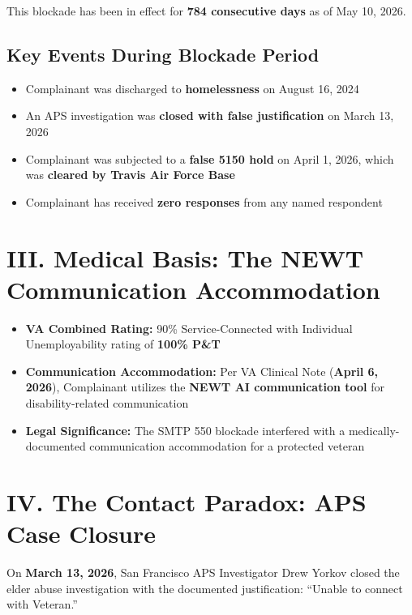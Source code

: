 \documentclass[11pt, a4paper]{article}
\begin{document}
This blockade has been in effect for \textbf{784 consecutive days} as of May 10, 2026.

\subsection{Key Events During Blockade Period}
\begin{itemize}
    \item Complainant was discharged to \textbf{homelessness} on August 16, 2024
    \item An APS investigation was \textbf{closed with false justification} on March 13, 2026
    \item Complainant was subjected to a \textbf{false 5150 hold} on April 1, 2026, which was \textbf{cleared by Travis Air Force Base}
    \item Complainant has received \textbf{zero responses} from any named respondent
\end{itemize}

\vspace{0.5cm}

\section{III. Medical Basis: The NEWT Communication Accommodation}

\begin{itemize}
    \item \textbf{VA Combined Rating:} 90\% Service-Connected with Individual Unemployability rating of \textbf{100\% P\&T}
    \item \textbf{Communication Accommodation:} Per VA Clinical Note (\textbf{April 6, 2026}), Complainant utilizes the \textbf{NEWT AI communication tool} for disability-related communication
    \item \textbf{Legal Significance:} The SMTP 550 blockade interfered with a medically-documented communication accommodation for a protected veteran
\end{itemize}

\vspace{0.5cm}

\section{IV. The Contact Paradox: APS Case Closure}

On \textbf{March 13, 2026}, San Francisco APS Investigator Drew Yorkov closed the elder abuse investigation with the documented justification: ``Unable to connect with Veteran.''
\end{document}
